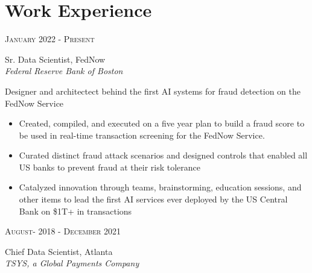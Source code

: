 \documentclass[10pt]{article} %
\begin{document}
\begin{minipage}[t]{0.5\textwidth} %
\vspace{0pt} %
	

\section{Work Experience} 

{\raggedleft\textsc{January 2022 - Present}\par}

{\raggedright\large Sr. Data Scientist,  FedNow\\ 
\textit{Federal Reserve Bank of Boston}\\[5pt]}

\normalsize{Designer and architectect behind the first AI systems for fraud detection on the FedNow Service     \\

\begin{itemize}
\item Created, compiled, and executed on a five year plan to build a fraud score to be used in real-time transaction screening for the FedNow Service. 
\item Curated distinct fraud attack scenarios and designed controls that enabled all US banks to prevent fraud at their risk tolerance
\item Catalyzed innovation through teams, brainstorming, education sessions, and other items to lead the first AI services ever deployed by the US Central Bank on \$1T+ in transactions
\end{itemize}}

{\raggedleft\textsc{August- 2018 - December 2021}\par}

{\raggedright\large Chief Data Scientist, Atlanta\\ 
\textit{TSYS, a Global Payments Company}\\[5pt]}


\end{minipage}
\end{document}
